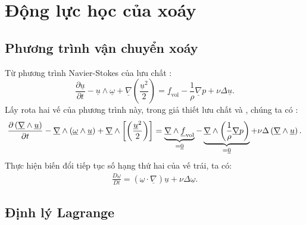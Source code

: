 \documentclass[CO_LUU_CHAT.tex]{subfiles}
\begin{document}
\section{Động lực học của xoáy}
\subsection{Phương trình vận chuyển xoáy}

	Từ phương trình Navier-Stokes của lưu chất :
		$$
			\frac{{\partial\underline u}}{{\partial t}} - \underline u \wedge \underline \omega   + \underline{\nabla}\left( {\frac{{{{\underline u}^2}}}{2}} \right) = \underline f_{\text{vol}}  - \frac{1}{\rho }\underline {\nabla} p + \nu \Delta \underline u.
		$$
	Lấy rota hai vế của phương trình này, trong giả thiết lưu chất  và , chúng ta có :
		\[
			\frac{{\partial \left( {\underline \nabla   \wedge \underline u} \right)}}{{\partial t}} - \underline \nabla   \wedge \left( { \underline\omega\wedge\underline u } \right) + \underline \nabla   \wedge \left[ {\left( {\frac{{{{\underline u}^2}}}{2}} \right)} \right] = \underbrace{\underline \nabla   \wedge {\underline f_{{\rm{vol}}}}}_{=\underline 0} - \underbrace{\underline \nabla   \wedge \left( {\frac{1}{\rho }\underline\nabla p} \right)}_{=\underline0} + \nu \Delta \left( {\underline \nabla   \wedge\underline u } \right).
		\]
	Thực hiện biến đổi tiếp tục số hạng thứ hai của vế trái, ta có:
		\begin{equation}\label{eq:vortex_only}
			\begin{aligned}
				\boxed{
					\frac{{D\underline \omega  }}{{Dt}}= \left( {\underline \omega   \cdot \underline {\nabla} } \right)\underline u  + \nu \Delta \underline \omega
				}.
			\end{aligned}
		\end{equation}
	\subsection{Định lý Lagrange}
	
\end{document}
